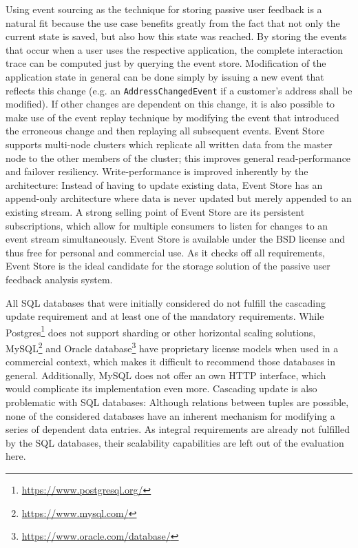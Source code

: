 Using event sourcing as the technique for storing passive user feedback is a natural fit because the use case benefits greatly from the fact that not only the current state is saved, but also how this state was reached.
By storing the events that occur when a user uses the respective application, the complete interaction trace can be computed just by querying the event store.
Modification of the application state in general can be done simply by issuing a new event that reflects this change (e.g. an \texttt{AddressChangedEvent} if a customer's address shall be modified).
If other changes are dependent on this change, it is also possible to make use of the event replay technique by modifying the event that introduced the erroneous change and then replaying all subsequent events.
Event Store supports multi-node clusters which replicate all written data from the master node to the other members of the cluster; this improves general read-performance and failover resiliency.
Write-performance is improved inherently by the architecture:
Instead of having to update existing data, Event Store has an append-only architecture where data is never updated but merely appended to an existing stream.
A strong selling point of Event Store are its persistent subscriptions, which allow for multiple consumers to listen for changes to an event stream simultaneously.
Event Store is available under the BSD license and thus free for personal and commercial use.
As it checks off all requirements, Event Store is the ideal candidate for the storage solution of the passive user feedback analysis system.

All \ac{SQL} databases that were initially considered do not fulfill the cascading update requirement and at least one of the mandatory requirements.
While Postgres\footnote{\url{https://www.postgresql.org/}} does not support sharding or other horizontal scaling solutions, MySQL\footnote{\url{https://www.mysql.com/}} and Oracle database\footnote{\url{https://www.oracle.com/database/}} have proprietary license models when used in a commercial context, which makes it difficult to recommend those databases in general.
Additionally, MySQL does not offer an own HTTP interface, which would complicate its implementation even more.
Cascading update is also problematic with \ac{SQL} databases: Although relations between tuples are possible, none of the considered databases have an inherent mechanism for modifying a series of dependent data entries.
As integral requirements are already not fulfilled by the \ac{SQL} databases, their scalability capabilities are left out of the evaluation here.


